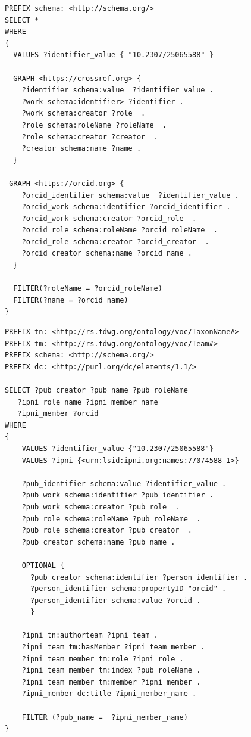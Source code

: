 \documentclass[runningheads]{llncs}
\begin{document}
\begin{lstlisting}[captionpos=b, caption=SPARQL query to match authors in CrossRef and ORCID, label=sparql1,
   basicstyle=\ttfamily,frame=single]
PREFIX schema: <http://schema.org/>
SELECT *
WHERE
{
  VALUES ?identifier_value { "10.2307/25065588" }
  
  GRAPH <https://crossref.org> {
    ?identifier schema:value  ?identifier_value .
    ?work schema:identifier> ?identifier .
    ?work schema:creator ?role  . 
    ?role schema:roleName ?roleName  .    
    ?role schema:creator ?creator  .    
    ?creator schema:name ?name .     
  }
    
 GRAPH <https://orcid.org> {
    ?orcid_identifier schema:value  ?identifier_value .
    ?orcid_work schema:identifier ?orcid_identifier .
    ?orcid_work schema:creator ?orcid_role  . 
    ?orcid_role schema:roleName ?orcid_roleName  .    
    ?orcid_role schema:creator ?orcid_creator  .    
    ?orcid_creator schema:name ?orcid_name .
  }
        
  FILTER(?roleName = ?orcid_roleName) 
  FILTER(?name = ?orcid_name) 
}   
\end{lstlisting}

\begin{lstlisting}[captionpos=b, caption=SPARQL query to match author in IPNI and ORCID, label=sparql,
   basicstyle=\ttfamily,frame=single]
PREFIX tn: <http://rs.tdwg.org/ontology/voc/TaxonName#>
PREFIX tm: <http://rs.tdwg.org/ontology/voc/Team#>
PREFIX schema: <http://schema.org/>
PREFIX dc: <http://purl.org/dc/elements/1.1/>

SELECT ?pub_creator ?pub_name ?pub_roleName 
   ?ipni_role_name ?ipni_member_name 
   ?ipni_member ?orcid
WHERE
{
    VALUES ?identifier_value {"10.2307/25065588"}
    VALUES ?ipni {<urn:lsid:ipni.org:names:77074588-1>} 
 
    ?pub_identifier schema:value ?identifier_value .
    ?pub_work schema:identifier ?pub_identifier .
    ?pub_work schema:creator ?pub_role  . 
    ?pub_role schema:roleName ?pub_roleName  .    
    ?pub_role schema:creator ?pub_creator  .    
    ?pub_creator schema:name ?pub_name .
  
    OPTIONAL {
      ?pub_creator schema:identifier ?person_identifier .
      ?person_identifier schema:propertyID "orcid" .
      ?person_identifier schema:value ?orcid .
      }
  
    ?ipni tn:authorteam ?ipni_team .
    ?ipni_team tm:hasMember ?ipni_team_member .
    ?ipni_team_member tm:role ?ipni_role .
    ?ipni_team_member tm:index ?pub_roleName .
    ?ipni_team_member tm:member ?ipni_member .
    ?ipni_member dc:title ?ipni_member_name .

    FILTER (?pub_name =  ?ipni_member_name)
}
\end{lstlisting}
\end{document}
